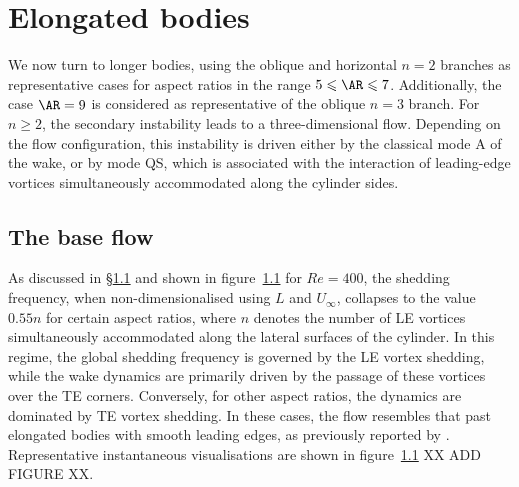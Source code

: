 \section{Elongated bodies}

We now turn to longer bodies, using the oblique and horizontal $n = 2$ branches as representative cases for aspect ratios in the range $5 \le \AR \le 7$. Additionally, the case $\AR = 9$ is considered as representative of the oblique $n = 3$ branch. For $n \ge 2$, the secondary instability leads to a three-dimensional flow. Depending on the flow configuration, this instability is driven either by the classical mode A of the wake, or by mode QS, which is associated with the interaction of leading-edge vortices simultaneously accommodated along the cylinder sides.

\subsection{The base flow}

As discussed in \S\ref{} and shown in figure~\ref{} for $Re = 400$, the shedding frequency, when non-dimensionalised using $L$ and $U_\infty$, collapses to the value $0.55n$ for certain aspect ratios, where $n$ denotes the number of LE vortices simultaneously accommodated along the lateral surfaces of the cylinder. In this regime, the global shedding frequency is governed by the LE vortex shedding, while the wake dynamics are primarily driven by the passage of these vortices over the TE corners. Conversely, for other aspect ratios, the dynamics are dominated by TE vortex shedding. In these cases, the flow resembles that past elongated bodies with smooth leading edges, as previously reported by \cite{chiarini-quadrio-auteri-2022}. Representative instantaneous visualisations are shown in figure~\ref{} XX ADD FIGURE XX.

